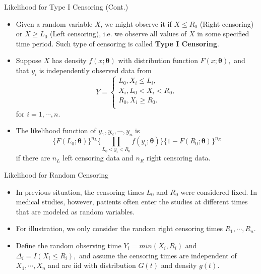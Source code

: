 \documentclass{beamer}
\begin{document}
    

   \begin{frame}{Likelihood for Type I Censoring (Cont.)}
        \begin{itemize}
            \item Given a random variable $X$, we might observe it if $X \leq R_{0}$ (Right censoring) or $X \geq L_{0}$ (Left censoring), i.e. we observe all values of $X$ in some specified time period. Such type of censoring is called {\bf Type I Censoring}.
            \item Suppose $X$ has density $f(x;\boldsymbol{\theta})$ with distribution function $F(x;\boldsymbol{\theta}),$ and that $y_{i}$ is independently observed data from 
            $$Y = \left\{\begin{array}{cc}
                 L_{0}, X_{i} \leq L_{i},  \\
                 X_{i}, L_{0} <  X_{i} < R_{0},  \\
                 R_{0}, X_{i} \geq R_{0}.  \\
            \end{array}\right.$$
            for $i = 1, \cdots, n.$
            \item The likelihood function of $y_{1}, y_{2}, \cdots, y_{n}$ is 
            $$\{F(L_{0};\boldsymbol{\theta})\}^{n_{L}}\{\prod_{L_{0} < y_{i} < R_{0}} f(y_{i};\boldsymbol{\theta})\}\{1-F(R_{0}; \boldsymbol{\theta})\}^{n_{R}}$$
            if there are $n_{L}$ left censoring data and $n_{R}$ right censoring data.
        \end{itemize}
    \end{frame}
    
    
    \begin{frame}{Likelihood for Random Censoring}
        \begin{itemize}
            \item In previous situation, the censoring times $L_{0}$ and $R_{0}$ were considered fixed. In medical studies, however, patients often enter the studies at different times that are modeled as random variables.
            \item For illustration, we only consider the random right censoring times $R_{1}, \cdots, R_{n}$. 
            \item Define the random observing time  $Y_{i} = min(X_{i}, R_{i})$ and $\Delta_{i} = I(X_{i} \leq R_{i}),$ and assume the censoring times are independent of $X_{1}, \cdots, X_{n}$ and are iid with distribution $G(t)$ and density $g(t)$.
        \end{itemize}
    \end{frame}
    
\end{document}
